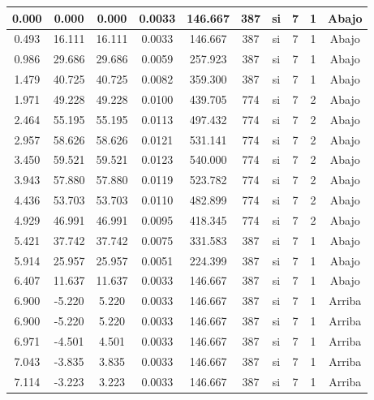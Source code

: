 \begin{table}[H]
{\begin{tabular}{|c|c|c|c|c|c|c|c|c|c|}
       0.000 & 0.000 & 0.000 & 0.0033 & 146.667 & 387 & si  & 7   & 1   & Abajo \bigstrut\\
    \hline
    0.493 & 16.111 & 16.111 & 0.0033 & 146.667 & 387 & si  & 7   & 1   & Abajo \bigstrut\\
    \hline
    0.986 & 29.686 & 29.686 & 0.0059 & 257.923 & 387 & si  & 7   & 1   & Abajo \bigstrut\\
    \hline
    1.479 & 40.725 & 40.725 & 0.0082 & 359.300 & 387 & si  & 7   & 1   & Abajo \bigstrut\\
    \hline
    1.971 & 49.228 & 49.228 & 0.0100 & 439.705 & 774 & si  & 7   & 2   & Abajo \bigstrut\\
    \hline
    2.464 & 55.195 & 55.195 & 0.0113 & 497.432 & 774 & si  & 7   & 2   & Abajo \bigstrut\\
    \hline
    2.957 & 58.626 & 58.626 & 0.0121 & 531.141 & 774 & si  & 7   & 2   & Abajo \bigstrut\\
    \hline
    3.450 & 59.521 & 59.521 & 0.0123 & 540.000 & 774 & si  & 7   & 2   & Abajo \bigstrut\\
    \hline
    3.943 & 57.880 & 57.880 & 0.0119 & 523.782 & 774 & si  & 7   & 2   & Abajo \bigstrut\\
    \hline
    4.436 & 53.703 & 53.703 & 0.0110 & 482.899 & 774 & si  & 7   & 2   & Abajo \bigstrut\\
    \hline
    4.929 & 46.991 & 46.991 & 0.0095 & 418.345 & 774 & si  & 7   & 2   & Abajo \bigstrut\\
    \hline
    5.421 & 37.742 & 37.742 & 0.0075 & 331.583 & 387 & si  & 7   & 1   & Abajo \bigstrut\\
    \hline
    5.914 & 25.957 & 25.957 & 0.0051 & 224.399 & 387 & si  & 7   & 1   & Abajo \bigstrut\\
    \hline
    6.407 & 11.637 & 11.637 & 0.0033 & 146.667 & 387 & si  & 7   & 1   & Abajo \bigstrut\\
    \hline
    6.900 & -5.220 & 5.220 & 0.0033 & 146.667 & 387 & si  & 7   & 1   & Arriba \bigstrut\\
    \hline
    6.900 & -5.220 & 5.220 & 0.0033 & 146.667 & 387 & si  & 7   & 1   & Arriba \bigstrut\\
    \hline
    6.971 & -4.501 & 4.501 & 0.0033 & 146.667 & 387 & si  & 7   & 1   & Arriba \bigstrut\\
    \hline
    7.043 & -3.835 & 3.835 & 0.0033 & 146.667 & 387 & si  & 7   & 1   & Arriba \bigstrut\\
    \hline
    7.114 & -3.223 & 3.223 & 0.0033 & 146.667 & 387 & si  & 7   & 1   & Arriba \bigstrut\\

\end{tabular}}
\end{table}
